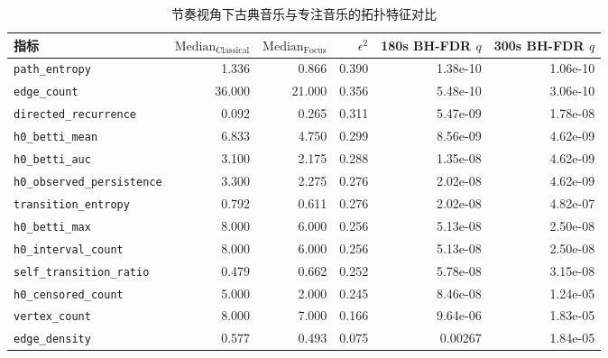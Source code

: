 \documentclass{article}
\begin{document}
\begin{table}[htbp]
\centering
\caption{节奏视角下古典音乐与专注音乐的拓扑特征对比}
\label{tab:rhythm_topology}
\begin{tabular}{lrrrrr}
\toprule
指标                    & $\text{Median}_{\text{Classical}}$ & $\text{Median}_{\text{Focus}}$ & $\epsilon^2$ & 180s BH-FDR $q$ & 300s BH-FDR $q$ \\
\midrule
\rowcolor{green!15}\verb|path_entropy|            &            1.336 &             0.866 &        0.390 &  1.38e-10 &  1.06e-10 \\
\rowcolor{green!15}\verb|edge_count|              &           36.000 &            21.000 &        0.356 &  5.48e-10 &  3.06e-10 \\
\rowcolor{green!15}\verb|directed_recurrence|     &            0.092 &             0.265 &        0.311 &  5.47e-09 &  1.78e-08 \\
\rowcolor{green!15}\verb|h0_betti_mean|           &            6.833 &             4.750 &        0.299 &  8.56e-09 &  4.62e-09 \\
\rowcolor{green!15}\verb|h0_betti_auc|            &            3.100 &             2.175 &        0.288 &  1.35e-08 &  4.62e-09 \\
\rowcolor{green!15}\verb|h0_observed_persistence| &            3.300 &             2.275 &        0.276 &  2.02e-08 &  4.62e-09 \\
\rowcolor{green!15}\verb|transition_entropy|      &            0.792 &             0.611 &        0.276 &  2.02e-08 &  4.82e-07 \\
\rowcolor{green!15}\verb|h0_betti_max|            &            8.000 &             6.000 &        0.256 &  5.13e-08 &  2.50e-08 \\
\rowcolor{green!15}\verb|h0_interval_count|       &            8.000 &             6.000 &        0.256 &  5.13e-08 &  2.50e-08 \\
\rowcolor{green!15}\verb|self_transition_ratio|   &            0.479 &             0.662 &        0.252 &  5.78e-08 &  3.15e-08 \\
\rowcolor{green!15}\verb|h0_censored_count|       &            5.000 &             2.000 &        0.245 &  8.46e-08 &  1.24e-05 \\
\rowcolor{green!15}\verb|vertex_count|            &            8.000 &             7.000 &        0.166 &  9.64e-06 &  1.83e-05 \\
\rowcolor{green!15}\verb|edge_density|            &            0.577 &             0.493 &        0.075 &    0.00267 &  1.84e-05 \\

\end{tabular}
\end{table}
\end{document}

